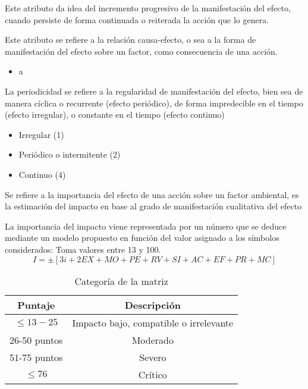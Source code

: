 \begin{definition}[Acumulación (AC)]
    Este atributo da idea del incremento progresivo de la manifestación del efecto, cuando persiste de forma continuada o reiterada la acción que lo genera.
\end{definition}

\begin{definition}[Efecto (EF)]
    Este atributo se refiere a la relación causa-efecto, o sea a la forma de manifestación del efecto sobre un factor, como consecuencia de una acción.
\end{definition}
\begin{itemize}
    \item a
\end{itemize}


\begin{definition}[Periodicidad (PR)]
    La periodicidad se refiere a la regularidad de manifestación del efecto, bien sea de manera cíclica o recurrente (efecto periódico), de forma impredecible en el tiempo (efecto irregular), o constante en el tiempo (efecto continuo)
\end{definition}
\begin{itemize}
    \item Irregular (1)
    \item Periódico o intermitente (2)
    \item Continuo (4)
\end{itemize}

Se refiere a la importancia del efecto de una acción sobre un factor ambiental, es la estimación del impacto en base al grado de manifestación cualitativa del efecto

La importancia del impacto viene representada por un número que se deduce mediante un modelo propuesto en función del valor asignado a los símbolos considerados: Toma valores entre 13 y 100.
\begin{equation}
I = \pm \left[ 3i +2EX+MO+PE +RV +SI + AC + EF + PR + MC \right] 
\end{equation}
\begin{table}[h!]
    \centering
    \begin{tabular}{@{}cc@{}}
    \toprule
    Puntaje      & Descripción                            \\ \midrule
    $\leq 13-25$ & Impacto bajo, compatible o irrelevante \\
    26-50 puntos & Moderado                               \\
    51-75 puntos & Severo                                 \\
    $\leq 76$    & Crítico                                \\ \bottomrule
    \end{tabular}
    \caption{Categoría de la matriz}
    \label{ia}
\end{table}
